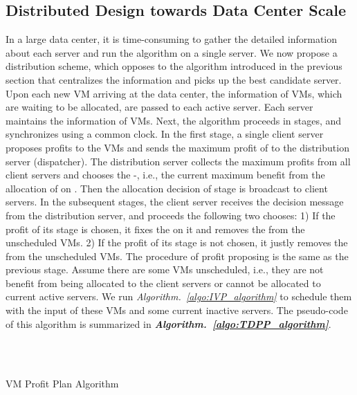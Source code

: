 \documentclass[10pt,journal]{IEEEtran}
\begin{document}
\subsection{Distributed Design towards Data Center Scale}
In a large data center, it is time-consuming to gather the detailed information about each server and run the algorithm on a single server. We now propose a distribution scheme, which opposes to the algorithm introduced in the previous section that centralizes the information and picks up the best candidate server. Upon each new VM arriving at the data center, the information of VMs, which are waiting to be allocated, are passed to each active server. Each server  maintains the information of VMs. Next, the algorithm proceeds in stages, and synchronizes using a common clock. In the first stage, a single client server  proposes profits to the VMs and sends the maximum profit  of  to the distribution server (dispatcher). The distribution server collects the maximum profits from all client servers and chooses the -, i.e., the current maximum benefit from the allocation of  on . Then the allocation decision of stage  is broadcast to client servers. In the subsequent stages, the client server  receives the decision message  from the distribution server, and proceeds the following two chooses: 1) If the profit of its  stage is chosen, it fixes the  on it and removes the  from the unscheduled VMs. 2) If the profit of its  stage is not chosen, it justly removes the  from the unscheduled VMs. The procedure of profit proposing is the same as the previous stage. Assume there are some VMs unscheduled, i.e., they are not benefit from being allocated to the client servers or cannot be allocated to current active servers. We run \textit{Algorithm.~\ref{algo:IVP_algorithm}} to schedule them with the input of these VMs and some current inactive servers. The pseudo-code of this algorithm is summarized in \textbf{\textit{Algorithm.~\ref{algo:TDPP_algorithm}}}.
\begin{algorithm}
\\
\\
\caption{\label{algo:TDPP_algorithm}VM Profit Plan Algorithm}
\end{algorithm}
\end{document}

